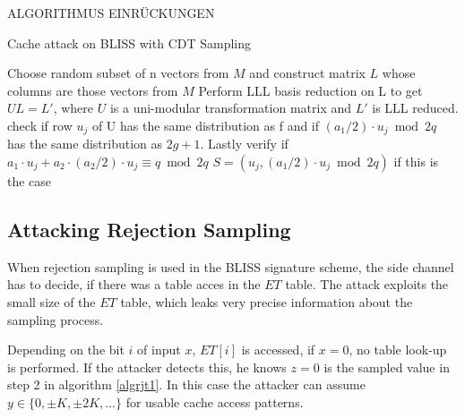 ALGORITHMUS EINRÜCKUNGEN
\begin{algorithm}
	\caption{Cache attack on BLISS with CDT Sampling}
	\label{algcdtattack}
	\begin{algorithmic}[1]
		\EndIf
		\EndFor
		\EndWhile
			\State Choose random subset of n vectors from $M$ and construct matrix $L$ whose columns are those vectors from $M$
			\State Perform LLL basis reduction on L to get $UL = L'$, where $U$ is a uni-modular transformation matrix and $L'$ is LLL reduced.
				\State check if row $u_j$ of U has the same distribution as f and if $(a_1/2)\cdot u_j \bmod 2q$ has the same distribution as $2g+1$. Lastly verify if $a_1 \cdot u_j + a_2 \cdot (a_2/2)\cdot u_j \equiv q \bmod 2q$
				\State
				\Return $S = (u_j, (a_1/2)\cdot u_j \bmod 2q)$ if this is the case
			\EndFor
		\EndWhile
	\end{algorithmic}
\end{algorithm} 
\subsection{Attacking Rejection Sampling} \label{rejection}
When rejection sampling is used in the BLISS signature scheme, the side channel has to decide, if there was a table acces in the $ET$ table. The attack exploits the small size of the $ET$ table, which leaks very precise information about the sampling process.

Depending on the bit $i$ of input $x$, $ET[i]$ is accessed, if $x = 0$, no table look-up is performed. If the attacker detects this, he knows $z=0$ is the sampled value in step 2 in algorithm \ref{algrjt1}. In this case the attacker can assume $y \in \{0, \pm K, \pm 2K,...\}$ for usable cache access patterns.


